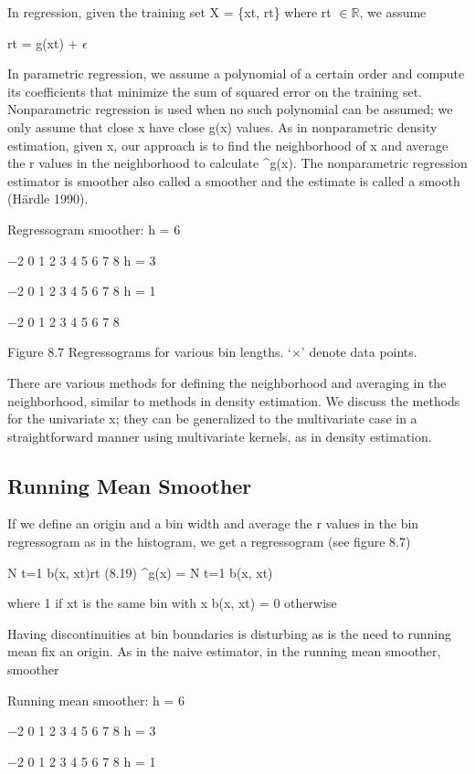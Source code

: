 In regression, given the training set X = \{xt, rt\} where rt $\in$$\mathbb{R}$, we assume

rt = g(xt) + $\epsilon$

In parametric regression, we assume a polynomial of a certain order and compute its coefficients that minimize the sum of squared error on the training set. Nonparametric regression is used when no such polynomial can be assumed; we only assume that close x have close g(x) values. As in nonparametric density estimation, given x, our approach is to find the neighborhood of x and average the r values in the neighborhood to calculate \textasciicircum{}g(x). The nonparametric regression estimator is smoother also called a smoother and the estimate is called a smooth (Härdle 1990).

Regressogram smoother: h = 6

$-$2 0 1 2 3 4 5 6 7 8 h = 3

$-$2 0 1 2 3 4 5 6 7 8 h = 1

$-$2 0 1 2 3 4 5 6 7 8

Figure 8.7 Regressograms for various bin lengths. ‘$\times$’ denote data points.

There are various methods for defining the neighborhood and averaging in the neighborhood, similar to methods in density estimation. We discuss the methods for the univariate x; they can be generalized to the multivariate case in a straightforward manner using multivariate kernels, as in density estimation.

\subsection{Running Mean Smoother}

If we define an origin and a bin width and average the r values in the bin regressogram as in the histogram, we get a regressogram (see figure 8.7)

N t=1 b(x, xt)rt (8.19) \textasciicircum{}g(x) = N t=1 b(x, xt)

where 1 if xt is the same bin with x b(x, xt) = 0 otherwise

Having discontinuities at bin boundaries is disturbing as is the need to running mean fix an origin. As in the naive estimator, in the running mean smoother, smoother

Running mean smoother: h = 6

$-$2 0 1 2 3 4 5 6 7 8 h = 3

$-$2 0 1 2 3 4 5 6 7 8 h = 1

